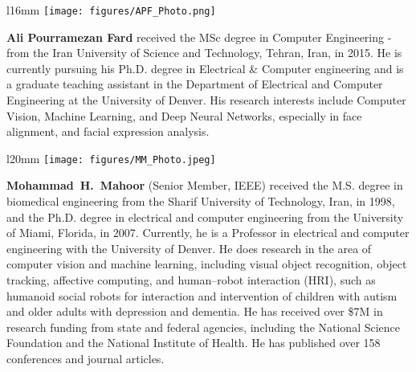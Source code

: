 \documentclass[sn-mathphys,iicol,Numbered]{sn-jnl}
\begin{document}
\begin{wrapfigure}{l}{16mm} 
\texttt{[image: figures/APF\_Photo.png]}
\end{wrapfigure}\par
\textbf{Ali Pourramezan Fard} received the MSc degree in Computer Engineering - from the Iran University of Science and Technology, Tehran, Iran, in 2015. He is currently pursuing his Ph.D. degree in Electrical \& Computer engineering and is a graduate teaching assistant in the Department of Electrical and Computer Engineering at the University of Denver. His research interests include Computer Vision, Machine Learning, and Deep Neural Networks, especially in face alignment, and facial expression analysis.

\begin{wrapfigure}{l}{20mm} 
\texttt{[image: figures/MM\_Photo.jpeg]}
\end{wrapfigure}\par
\textbf{Mohammad~H.~Mahoor} (Senior Member, IEEE) received the M.S. degree in biomedical engineering from the Sharif University of Technology, Iran, in 1998, and the Ph.D. degree in electrical and computer engineering from the University of Miami, Florida, in 2007. Currently, he is a Professor in electrical and computer engineering with the University of Denver. He does research in the area of computer vision and machine learning, including visual object recognition, object tracking, affective computing, and human–robot interaction (HRI), such as humanoid social robots for interaction and intervention of children with autism and older adults with depression and dementia. He has received over \$7M in research funding from state and federal agencies, including the National Science Foundation and the National Institute of Health. He has published over 158 conferences and journal articles.
\end{document}
